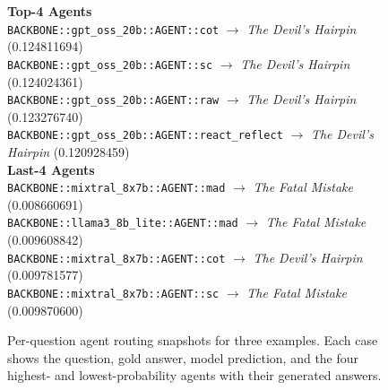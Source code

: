 \documentclass[11pt]{article}
\begin{document}
\begin{figure}[t]
\begin{tcolorbox}[colback=myblue!5!white,
                  colframe=myblue!75!black,
                  title=Agent Routing Examples (Three QA Cases)]
{\vspace{4pt}
\textbf{Top-4 Agents}\\
\texttt{BACKBONE::gpt\_oss\_20b::AGENT::cot} $\rightarrow$ \emph{The Devil's Hairpin} (0.124811694)\\
\texttt{BACKBONE::gpt\_oss\_20b::AGENT::sc} $\rightarrow$ \emph{The Devil's Hairpin} (0.124024361)\\
\texttt{BACKBONE::gpt\_oss\_20b::AGENT::raw} $\rightarrow$ \emph{The Devil's Hairpin} (0.123276740)\\
\texttt{BACKBONE::gpt\_oss\_20b::AGENT::react\_reflect} $\rightarrow$ \emph{The Devil's Hairpin} (0.120928459)\\[4pt]
\textbf{Last-4 Agents}\\
\texttt{BACKBONE::mixtral\_8x7b::AGENT::mad} $\rightarrow$ \emph{The Fatal Mistake} (0.008660691)\\
\texttt{BACKBONE::llama3\_8b\_lite::AGENT::mad} $\rightarrow$ \emph{The Fatal Mistake} (0.009608842)\\
\texttt{BACKBONE::mixtral\_8x7b::AGENT::cot} $\rightarrow$ \emph{The Devil's Hairpin} (0.009781577)\\
\texttt{BACKBONE::mixtral\_8x7b::AGENT::sc} $\rightarrow$ \emph{The Fatal Mistake} (0.009870600)
}
\end{tcolorbox}

\vspace{-8pt}
\caption{Per-question agent routing snapshots for three examples. Each case shows the question, gold answer, model prediction, and the four highest- and lowest-probability agents with their generated answers.}
\label{fig:agent-routing-three-examples}
\end{figure}
\end{document}
